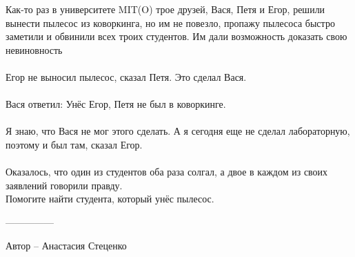 \question
Как-то раз в университете MIT(O) трое друзей, Вася, Петя и Егор, решили вынести пылесос из коворкинга, но им не повезло, пропажу пылесоса быстро заметили и обвинили всех троих студентов. Им дали возможность доказать свою невиновность
\\
\\
{\textemdash} Егор не выносил пылесос, {\textemdash} сказал Петя. {\textemdash} Это сделал Вася.
\\
\\
Вася ответил:  {\textemdash} Унёс Егор, Петя не был в коворкинге.
\\
\\
{\textemdash} Я знаю, что Вася не мог этого сделать. А я сегодня еще не сделал лабораторную, поэтому и был там, {\textemdash} сказал Егор.
\\
\\
Оказалось, что один из студентов оба раза солгал, а двое в каждом из своих заявлений говорили правду.
\\
Помогите найти студента, который унёс пылесос.

---------------

Автор -- Анастасия Стеценко